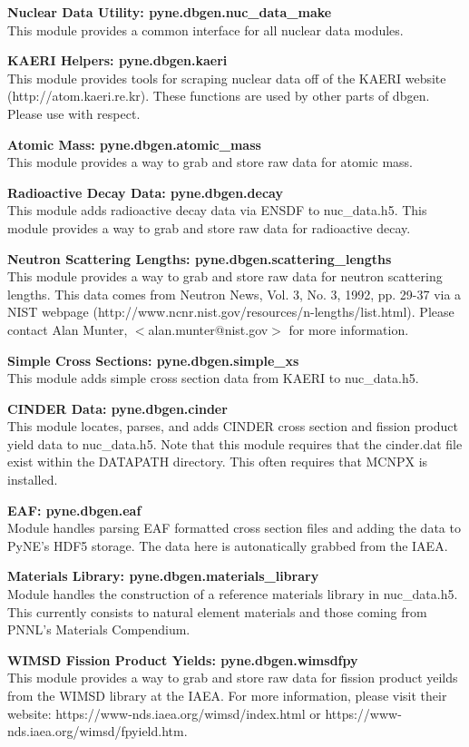 \documentclass{proposalnsf}
\begin{document}
\textbf{Nuclear Data Utility: pyne.dbgen.nuc\_data\_make}\\
This module provides a common interface for all nuclear data modules.

\textbf{KAERI Helpers: pyne.dbgen.kaeri}\\
This module provides tools for scraping nuclear data off of the KAERI website (http://atom.kaeri.re.kr). These functions are used by other parts of dbgen. Please use with respect.

\textbf{Atomic Mass: pyne.dbgen.atomic\_mass}\\
This module provides a way to grab and store raw data for atomic mass.

\textbf{Radioactive Decay Data: pyne.dbgen.decay}\label{decay} \\
This module adds radioactive decay data via ENSDF to nuc\_data.h5.
This module provides a way to grab and store raw data for radioactive decay.

\textbf{Neutron Scattering Lengths: pyne.dbgen.scattering\_lengths}\\
This module provides a way to grab and store raw data for neutron scattering lengths. This data comes from Neutron News, Vol. 3, No. 3, 1992, pp. 29-37 via a NIST webpage (http://www.ncnr.nist.gov/resources/n-lengths/list.html). Please contact Alan Munter, $<$alan.munter@nist.gov$>$ for more information.

\textbf{Simple Cross Sections: pyne.dbgen.simple\_xs}\\
This module adds simple cross section data from KAERI to nuc\_data.h5.

\textbf{CINDER Data: pyne.dbgen.cinder}\\
This module locates, parses, and adds CINDER cross section and fission product yield data to nuc\_data.h5. Note that this module requires that the cinder.dat file exist within the DATAPATH directory. This often requires that MCNPX is installed.

\textbf{EAF: pyne.dbgen.eaf}\\
Module handles parsing EAF formatted cross section files and adding the data to PyNE’s HDF5 storage. The data here is autonatically grabbed from the IAEA.

\textbf{Materials Library: pyne.dbgen.materials\_library}\\
Module handles the construction of a reference materials library in nuc\_data.h5. This currently consists to natural element materials and those coming from PNNL’s Materials Compendium.

\textbf{WIMSD Fission Product Yields: pyne.dbgen.wimsdfpy}\\
This module provides a way to grab and store raw data for fission product yeilds from the WIMSD library at the IAEA. For more information, please visit their website: https://www-nds.iaea.org/wimsd/index.html or https://www-nds.iaea.org/wimsd/fpyield.htm.


%
%
%
%
\end{document}
